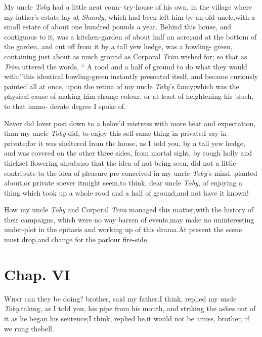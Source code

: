 \documentclass{article}
\begin{document}
My uncle \textit{Toby} had a little neat coun-\break
try-house of his own, in the village where my father’s estate lay at \textit{Shandy},
which had been left him by an old uncle,\break with a small estate of
about one hundred pounds a year. Behind this house, and contiguous
to it, was a kitchen-garden of about half an acre;\tsk and at the
bottom of the garden, and cut off from it\break
by a tall yew hedge, was a bowling-\break 
green, containing just about as much\pb
ground as Corporal
\textit{Trim} wished for;\tsk\break
so that as \textit{Trim} uttered the
words, “ A rood and a half of ground to do what\break
they would with:”\tsh this identical bowling-green instantly presented
itself, and became curiously painted all at once, upon the retina
of my uncle \textit{Toby}’s fancy;\break\tsh which was the physical
cause of making him change colour, or at least of heightening his
blush, to that immo-\break
derate degree I spoke of.

Never did lover post down to a belov’d mistress with more heat
and expectation, than my uncle \textit{Toby} did, to enjoy this
self-same thing in private;\tsk I say in private;\tsk for it was sheltered from the house, as
I told you, by a tall yew hedge, and was covered on the other three
sides, from mortal sight, by rough holly and thickset flowering
shrubs;\tsk so that the\pb
idea of not being seen, did not a little contribute to the
idea of pleasure pre-conceived in my uncle \textit{Toby}’s
mind.\tsk\break 
{}
planted about,\tsh or private soever it\break might seem,\tsk to think,
dear uncle \textit{Toby}, of enjoying a thing which took up
a whole rood and a half of ground,\tsk and\break
not have it known!

How my uncle \textit{Toby} and Corporal \textit{Trim} managed this
matter,\tsk with the history of their campaigns, which were no
way barren of events,\tsh may make no uninteresting
under-plot in the epitasis and working up of this drama.\tsk At
present the scene must drop,\tsk and change for the parlour
fire-side.

\section{Chap. VI}

\quad\tsh \textsc{What} can they be doing?\break
brother, said my father.\tsk I think, replied my uncle \textit{Toby},\tsk taking, as I told you,
his pipe from his mouth, and striking the ashes out of it as he
began his sentence;\tsh I think, replied he,\tsk it
would not be amiss, brother, if we rung the\break bell.
\end{document}
